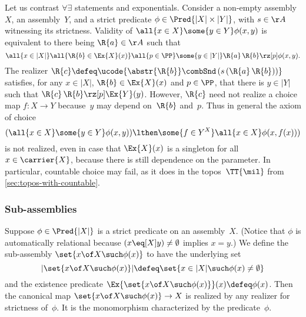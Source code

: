 \begin{example}
  Let us contrast $\forall\exists$ statements and exponentials. Consider a non-empty assembly~$X$, an assembly~$Y$, and
  a strict predicate $\phi \in \Pred{|X| \times |Y|}$, with $s \in \AA$ witnessing its strictness.
  Validity of $\all{x \in X} \some{y \in Y} \phi(x,y)$ is equivalent to there being $\R{a} \in \AA$ such that
  \begin{equation*}
    \all{x \in |X|} \all{\R{b} \in \Ex{X}(x)} \all{p \in \PP} \some{y \in |Y|} \R{a} \, \R{b} \rz[p] \phi(x,y).
  \end{equation*}
  The realizer $\R{c} \defeq \ucode{\abstr{\R{b}} \combSnd \, (s \, (\R{a} \, \R{b}))}$ satisfies, for any $x \in |X|$, $\R{b} \in \Ex{X}(x)$ and $p \in \PP$, that there is $y \in |Y|$ such that $\R{c} \, \R{b} \rz[p] \Ex{Y}(y)$. However, $\R{c}$ need not realize a choice map $f : X \to Y$ because~$y$ may depend on~$\R{b}$ and~$p$.
  Thus in general the axiom of choice
  \begin{equation*}
    (\all{x \in X} \some{y \in Y} \phi(x, y))
    \lthen
    \some{f \in Y^X} \all{x \in X} \phi(x, f(x)))
  \end{equation*}
  is not realized, even in case that $\Ex{X}(x)$ is a singleton for all~$x \in \carrier{X}$, because there is still dependence on the parameter. In particular, countable choice may fail, as it does in the topos~$\TT{\mil}$ from \cref{sec:topos-with-countable}.
\end{example}

\subsubsection{Sub-assemblies}
\label{sec:sub-assemblies}

Suppose $\phi \in \Pred{|X|}$ is a strict predicate on an assembly~$X$. (Notice that $\phi$ is automatically relational because $(x \eq[X] y) \neq \emptyset$ implies $x = y$.) We define the sub-assembly $\set{x \of X \such \phi(x)}$ to have the underlying set
%
\begin{equation*}
  |\set{x \of X \such \phi(x)}| \defeq \set{x \in |X| \such \phi(x) \neq \emptyset}
\end{equation*}
%
and the existence predicate $\Ex{\set{x \of X \such \phi(x)}}(x) \defeq \phi(x)$.
%
Then the canonical map $\set{x \of X \such \phi(x)} \to X$ is realized by any realizer for strictness of~$\phi$.
It is the monomorphism characterized by the predicate~$\phi$.


